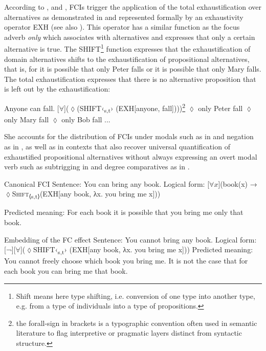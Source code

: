 According to \citet{Aloni2007,AloniPort2013}, and \citet{Aloni2021}, FCIs trigger the application of the total exhaustification over alternatives as demonstrated in  and represented formally by an exhaustivity operator {EXH} (see also \citealt{Menéndez-Benito2010}). This operator has a similar function as the focus adverb \textit{only} which associates with alternatives and expresses that only a certain alternative is true. The SHIFT\footnote{Shift means here type shifting, i.e. conversion of one type into another type, e.g. from a type of individuals into a type of propositions.}  function expresses that the exhaustification of domain alternatives shifts to the exhaustification of propositional alternatives, that is, for  it is possible that only Peter falls or it is possible that only Mary falls. The total exhaustification expresses that there is no alternative proposition that is left out by the exhaustification:

\ea %
\label{bkm:Ref150778689}  Anyone can fall. %
\ea{}  [${\forall}$](${\lozenge}$(\textsc{SHIFT}‹\textsubscript{s,t}›\textsubscript{} ({EXH}[anyone, fall])))\footnote{the forall-sign in brackets is a typographic convention often used in semantic literature to flag interpretive or pragmatic layers distinct from syntactic structure.}
\ex ${\lozenge}$ only Peter fall  ${\lozenge}$ only Mary fall  ${\lozenge}$ only Bob fall  ...

    \citep{AloniEtAl2011}
\z
\z

She accounts for the distribution of FCIs under modals such as in  and negation as in , as well as in contexts that also recover universal quantification of exhaustified propositional alternatives without always expressing an overt modal verb such as subtrigging in  and degree comparatives as in .

\ea %
\label{bkm:Ref63544535}   {Canonical FCI}
\ea  Sentence: You can bring any book.
\ex Logical form:
[$\forall x$](book(x) → $\lozenge$\textsc{Shift}\textsubscript{⟨s,t⟩}({EXH}[any book, λx. you bring me x]))

\ex Predicted meaning: For each book it is possible that you bring me only that book.
\z
\z


\ea %
\label{ex:key:83}   {Embedding of the FC effect}
\ea  Sentence: You cannot bring any book.
\ex Logical form: [¬][${\forall}$](${\lozenge}$\textsc{SHIFT}‹\textsubscript{s,t}› ({EXH}[any book, λx. you bring me x]))
\ex Predicted meaning: You cannot freely choose which book you bring me. It is not the case that for each book you can bring me that book.
\z
\z


